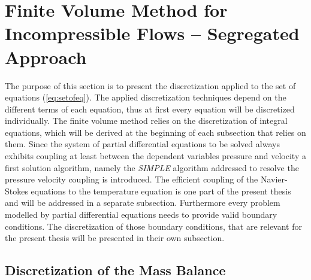   \section{Finite Volume Method for Incompressible Flows -- Segregated Approach}

  The purpose of this section is to present the discretization applied to the set of equations (\ref{eq:setofeq}). The applied discretization techniques depend on the different terms of each equation, thus at first every equation will be discretized individually. The finite volume method relies on the discretization of integral equations, which will be derived at the beginning of each subsection that relies on them. Since the system of partial differential equations to be solved always exhibits coupling at least between the dependent variables pressure and velocity a first solution algorithm, namely the \textit{SIMPLE} algorithm addressed to resolve the pressure velocity coupling is introduced. The efficient coupling of the Navier-Stokes equations to the temperature equation is one part of the present thesis and will be addressed in a separate subsection. Furthermore every problem modelled by partial differential equations needs to provide valid boundary conditions. The discretization of those boundary conditions, that are relevant for the present thesis will be presented in their own subsection.

    \subsection{Discretization of the Mass Balance}

